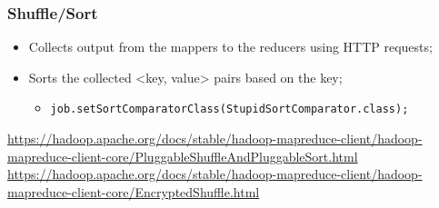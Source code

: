\documentclass[aspectratio=169]{beamer}
\begin{document}
\begin{frame}
	\frametitle{Shuffle/Sort}

	\begin{itemize}
		\item Collects output from the mappers to the reducers using HTTP requests;
		\item Sorts the collected <key, value> pairs based on the key;
		      \begin{itemize}
			      \item \texttt{job.setSortComparatorClass(StupidSortComparator.class);}
		      \end{itemize}
	\end{itemize}

	\begin{center}
		{\tiny \href{https://hadoop.apache.org/docs/stable/hadoop-mapreduce-client/hadoop-mapreduce-client-core/PluggableShuffleAndPluggableSort.html}{https://hadoop.apache.org/docs/stable/hadoop-mapreduce-client/hadoop-mapreduce-client-core/PluggableShuffleAndPluggableSort.html}}
		{\tiny \href{https://hadoop.apache.org/docs/stable/hadoop-mapreduce-client/hadoop-mapreduce-client-core/EncryptedShuffle.html}{https://hadoop.apache.org/docs/stable/hadoop-mapreduce-client/hadoop-mapreduce-client-core/EncryptedShuffle.html}}
	\end{center}
\end{frame}
\end{document}
